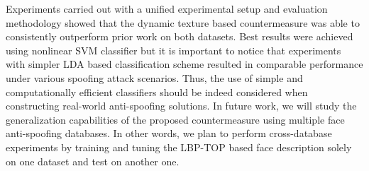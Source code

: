 Experiments carried out with a unified experimental setup and evaluation methodology showed that the dynamic texture based countermeasure was able to consistently outperform prior work on both datasets. Best results were achieved using nonlinear SVM classifier but it is important to notice that experiments with simpler LDA based classification scheme resulted in comparable performance under various spoofing attack scenarios. Thus, the use of simple and computationally efficient classifiers should be indeed considered when constructing real-world anti-spoofing solutions. In future work, we will study the generalization capabilities of the proposed countermeasure using multiple face anti-spoofing databases. In other words, we plan to perform cross-database experiments by training and tuning the LBP-TOP based face description solely on one dataset and test on another one.


